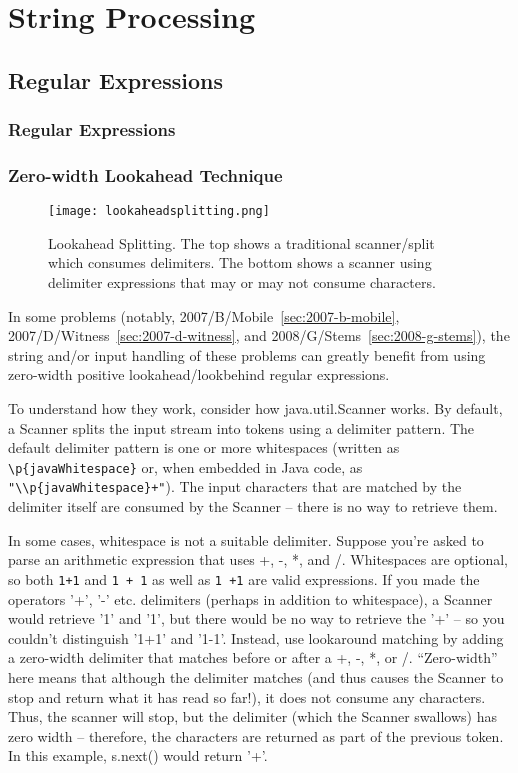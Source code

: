 \chapter{String Processing}

\section{Regular Expressions}

\subsection{Regular Expressions}

\subsection{Zero-width Lookahead Technique}
\label{sec:lookaroundsplitting}

\begin{figure}
    \centering
    \texttt{[image: lookaheadsplitting.png]}
    \caption{Lookahead Splitting. The top shows a traditional scanner/split which consumes delimiters.
    The bottom shows a scanner using delimiter expressions that may or may not consume characters.}
    \label{fig:lookaheadsplit}
\end{figure}

In some problems (notably, 
      2007/B/Mobile~\ref{sec:2007-b-mobile}, 
      2007/D/Witness~\ref{sec:2007-d-witness}, 
      and 2008/G/Stems~\ref{sec:2008-g-stems}),
the string and/or input handling of these problems can greatly 
benefit from using zero-width positive lookahead/lookbehind regular expressions.

To understand how they work, consider how java.util.Scanner works. By
default, a Scanner splits the input stream into tokens using a delimiter
pattern. The default delimiter pattern is one or more whitespaces
(written as \verb!\p{javaWhitespace}! or, when embedded in Java code, as
\verb!"\\p{javaWhitespace}+"!). The input characters that are matched by the
delimiter itself are consumed by the Scanner – there is no way to
retrieve them.

In some cases, whitespace is not a suitable delimiter. Suppose
you're asked to parse an arithmetic expression that uses +, -, *,
and /. Whitespaces are optional, so both \verb!1+1! and \verb!1 + 1! as well as 
\verb!1 +1! are valid expressions. If you made the operators '+', '-'
etc. delimiters (perhaps in addition to whitespace), a Scanner would
retrieve '1' and '1', but there would be no way to retrieve the
'+' – so you couldn’t distinguish '1+1' and '1-1'.  Instead, use
lookaround matching by adding a zero-width delimiter that matches before
or after a +, -, *, or /.  ``Zero-width'' here means that although
the delimiter matches (and thus causes the Scanner to stop and return
what it has read so far!), it does not consume any characters. Thus,
the scanner will stop, but the delimiter (which the Scanner swallows)
has zero width – therefore, the characters are returned as part of
the previous token. In this example, s.next() would return '+'.

